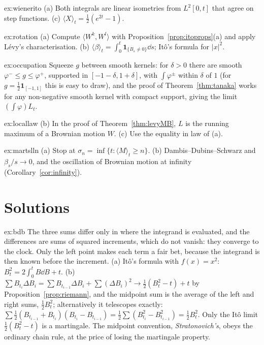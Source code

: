 \begin{hint}{ex:wienerito}
(a) Both integrals are linear isometries from $L^2[0,t]$ that agree on step functions. (c) $\langle X\rangle_t=\frac12(e^{2t}-1)$.
\end{hint}

\begin{hint}{ex:rotation}
(a) Compute $\langle W^k,W^l\rangle$ with Proposition~\ref{prop:itoprops}(a) and apply L\'evy's characterisation. (b) $\langle\beta\rangle_t=\int_0^t\mathbf 1_{\{B_s\ne0\}}\dd s$; It\^o's formula for $|x|^2$.
\end{hint}

\begin{hint}{ex:occupation}
Squeeze $g$ between smooth kernels: for $\delta>0$ there are smooth $\varphi^-\le g\le\varphi^+$, supported in $[-1-\delta,1+\delta]$, with $\int\varphi^\pm$ within $\delta$ of $1$ (for $g=\frac12\mathbf 1_{[-1,1]}$ this is easy to draw), and the proof of
Theorem~\ref{thm:tanaka} works for any non-negative smooth kernel with compact support, giving the limit $(\int\varphi)L_t$.
\end{hint}

\begin{hint}{ex:locallaw}
(b) In the proof of Theorem~\ref{thm:levyMB}, $L$ is the running maximum of a Brownian motion $W$. (c) Use the equality in law of (a).
\end{hint}

\begin{hint}{ex:martslln}
(a) Stop at $\sigma_n=\inf\{t:\langle M\rangle_t\ge n\}$. (b) Dambis--Dubins--Schwarz and $\beta_s/s\to0$, and the oscillation of Brownian motion at infinity (Corollary~\ref{cor:infinity}).
\end{hint}

\section{Solutions}

\begin{solution}{ex:bdb}
\idea The three sums differ only in where the integrand is evaluated, and the differences are sums of squared increments, which do not vanish: they converge to the clock. Only the left point makes each term a
fair bet, because the integrand is then known before the increment.
\writeup (a) It\^o's formula with $f(x)=x^2$: $B_t^2=2\int_0^tB\dd B+t$. (b) $\sum B_{t_i}\Delta B_i=\sum B_{t_{i-1}}\Delta B_i+\sum(\Delta B_i)^2\to\frac12(B_t^2-t)+t$ by Proposition~\ref{prop:riemann}, and the midpoint sum is the
average of the left and right sums, $\frac12B_t^2$; alternatively it telescopes exactly: $\sum\frac12(B_{t_{i-1}}+B_{t_i})(B_{t_i}-B_{t_{i-1}})=\frac12\sum(B_{t_i}^2-B_{t_{i-1}}^2)=\frac12B_t^2$. Only the It\^o limit $\frac12(B_t^2-t)$ is a
martingale. The midpoint convention, \emph{Stratonovich's}, obeys the ordinary chain rule, at the price of losing the martingale property.
\end{solution}

